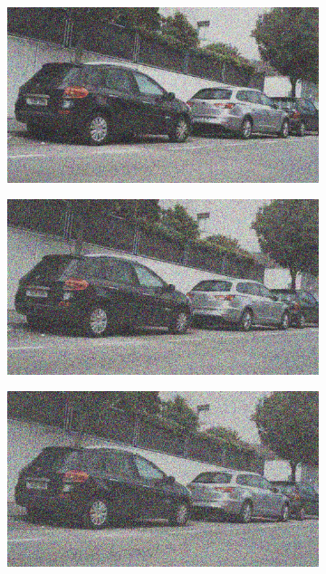 \documentclass[a4paper]{ctexart}
\begin{document}
\begin{figure}[htbp]
\begin{subfigure}{0.08\textwidth}
				\label{fig：Gamma=0.6, Gauss Noise = 0.4}
			\end{subfigure}
			\begin{subfigure}{0.08\textwidth}
				\captionsetup{font=scriptsize}
				\includegraphics[width=\linewidth]{picture/Edge Detection/degrade/RGB_001 Gamma=0.6, Gauss Noise=0.5}
				\label{fig：Gamma=0.6, Gauss Noise = 0.5}
			\end{subfigure}
			\begin{subfigure}{0.08\textwidth}
				\captionsetup{font=scriptsize}
				\includegraphics[width=\linewidth]{picture/Edge Detection/degrade/RGB_001 Gamma=0.6, Gauss Noise=0.6}
				\label{fig：Gamma=0.6, Gauss Noise = 0.6}
			\end{subfigure}
			\begin{subfigure}{0.08\textwidth}
				\captionsetup{font=scriptsize}
				\includegraphics[width=\linewidth]{picture/Edge Detection/degrade/RGB_001 Gamma=0.6, Gauss Noise=0.7}

\end{subfigure}
\end{figure}
\end{document}
